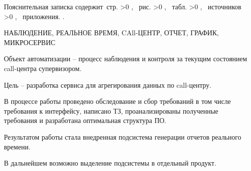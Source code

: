 \Referat

\thispagestyle{empty}

Пояснительная записка содержит \pageref{LastPage}\,стр.%
\ifnum \totfig >0
, \totfig~рис.%
\fi
\ifnum \tottab >0
, \tottab~табл.%
\fi
%
\ifnum \totbib >0
, \totbib~источников%
\fi
%
\ifnum \totapp >0
, \totapp~приложения.%
\else
.%
\fi

НАБЛЮДЕНИЕ, РЕАЛЬНОЕ ВРЕМЯ, CAll-ЦЕНТР, ОТЧЕТ, ГРАФИК, МИКРОСЕРВИС

Объект автоматизации -- процесс наблюдения и контроля за текущим состоянием call-центра супервизором.

Цель -- разработка сервиса для агрегирования данных по call-центру.

В процессе работы проведено обследование и сбор требований в том числе требования к интерфейсу,
написано ТЗ, проанализированы полученные требования и разработана оптимальная структура ПО.

Результатом работы стала внедренная подсистема генерации отчетов реального времени.

В дальнейшем возможно выделение подсистемы в отдельный продукт.